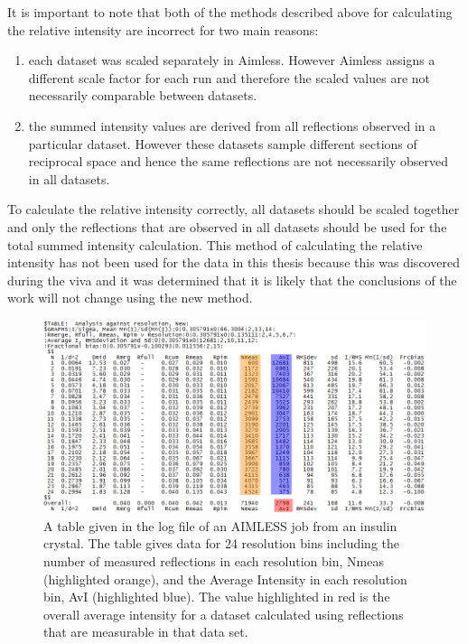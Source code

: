 It is important to note that both of the methods described above for calculating the relative intensity are incorrect for two main reasons:
\begin{enumerate}
    \item each dataset was scaled separately in Aimless. However Aimless assigns a different scale factor for each run and therefore the scaled values are not necessarily comparable between datasets.
    \item the summed intensity values are derived from all reflections observed in a particular dataset. However these datasets sample different sections of reciprocal space and hence the same reflections are not necessarily observed in all datasets.
\end{enumerate}
To calculate the relative intensity correctly, all datasets should be scaled together and only the reflections that are observed in all datasets should be used for the total summed intensity calculation.
This method of calculating the relative intensity has not been used for the data in this thesis because this was discovered during the viva and it was determined that it is likely that the conclusions of the work will not change using the new method.

\begin{figure}
  \centering
    \includegraphics[width=1\textwidth]{figures/dwd/aimlesslog.png}
    \caption[Resolution analysis table from the log file of an AIMLESS job.]{A table given in the log file of an AIMLESS job from an insulin crystal.
    The table gives data for 24 resolution bins including the number of measured reflections in each resolution bin, Nmeas (highlighted orange), and the Average Intensity in each resolution bin, AvI (highlighted blue).
    The value highlighted in red is the overall average intensity for a dataset calculated using reflections that are measurable in that data set.}
    \label{fig: AIMLESS log file}
\end{figure}

